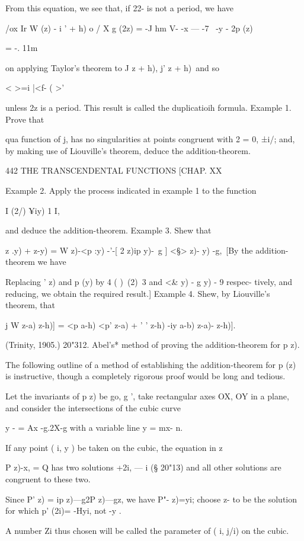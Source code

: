 {From this equation, we see that, if 22- is not a period, we have

/ox Ir W (z) - i ' + h) o / X g (2z) = -J hm V- -x — -7 ~-y - 2p (z)

= -. 11m

on applying Taylor's theorem to J z + h), j' z + h)\ and so

 < >=i |<f- ( >'

unless 2z is a period. This result is called the duplicatioih formula.
Example 1. Prove that

qua function of j, has no singularities at points congruent with 2 =
0, ±i/; and, by making use of Liouville's theorem, deduce the
addition-theorem.

442 THE TRANSCENDENTAL FUNCTIONS [CHAP. XX

Example 2. Apply the process indicated in example 1 to the function

I (2/) ¥iy) 1 I,

and deduce the addition-theorem. Example 3. Shew that

  z .y) + z-y) = W z)-<p :y) -'-[ 2 z)ip y)-\ g ] <§> z)- y) -g,\ [By
the addition-theorem we have

Replacing ' z) and p (y) by 4 ( )\ (2)\ 3 and <\& y) - g y) - 9
respec- tively, and reducing, we obtain the required result.] Example
4. Shew, by Liouville's theorem, that

j W z-a) z-h)] = <p a-h) <p' z-a) + ' ' z-h) -iy a-b) z-a)- z-h)].

(Trinity, 1905.) 20"312. Abel's* method of proving the
addition-theorem for p z).

The following outline of a method of establishing the addition-theorem
for p (z) is instructive, though a completely rigorous proof would be
long and tedious.

Let the invariants of p z) be go, g ', take rectangular axes OX, OY in
a plane, and consider the intersections of the cubic curve

y - = Ax -g.2X-g with a variable line y = mx- n.

If any point ( i, y ) be taken on the cubic, the equation in z

P z)-x, = Q has two solutions +2i, — i (§ 20"13) and all other
solutions are congruent to these two.

Since P' z) = ip z)—g2P z)—gz, we have P"- z)=yi; choose z- to be the
solution for which p' (2i)= -Hyi, not -y .

A number Zi thus chosen will be called the parameter of ( i, j/i) on
the cubic.

}
